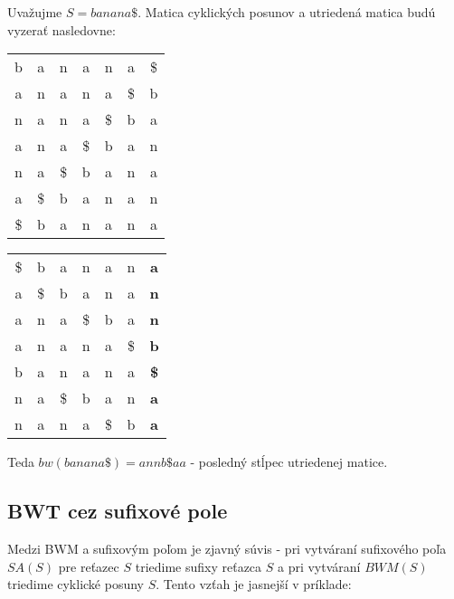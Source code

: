     \begin{example}
        Uvažujme $S = banana\$$. Matica cyklických posunov a utriedená matica 
        budú vyzerať nasledovne:
        
        \bigskip
        
        \begin{minipage}{2.5in}
            \begin{tabular}{ c c c c c c c }
                b  & a  & n  & a  & n  & a  & \$ \\
                a  & n  & a  & n  & a  & \$ & b  \\
                n  & a  & n  & a  & \$ & b  & a  \\
                a  & n  & a  & \$ & b  & a  & n  \\
                n  & a  & \$ & b  & a  & n  & a  \\
                a  & \$ & b  & a  & n  & a  & n  \\
                \$ & b  & a  & n  & a  & n  & a  \\
            \end{tabular}
        \end{minipage}
        \begin{minipage}{2.5in}
            \begin{tabular}{ c c c c c c c }
                \$ & b  & a  & n  & a  & n  & \textbf{a}  \\            
                a  & \$ & b  & a  & n  & a  & \textbf{n}  \\
                a  & n  & a  & \$ & b  & a  & \textbf{n}  \\
                a  & n  & a  & n  & a  & \$ & \textbf{b}  \\
                b  & a  & n  & a  & n  & a  & \textbf{\$} \\
                n  & a  & \$ & b  & a  & n  & \textbf{a}  \\ 
                n  & a  & n  & a  & \$ & b  & \textbf{a}  \\
            \end{tabular}
        \end{minipage}
        
        \bigskip
        
        Teda $bw(banana\$) = annb\$aa$ - posledný stĺpec utriedenej matice.
    \end{example}

    \subsection{BWT cez sufixové pole}
    Medzi BWM a sufixovým poľom je zjavný súvis - pri vytváraní sufixového poľa
    $SA(S)$ pre reťazec $S$ triedime sufixy reťazca $S$ a pri vytváraní $BWM(S)$
    triedime cyklické posuny $S$. Tento vzťah je jasnejší v príklade:
    
